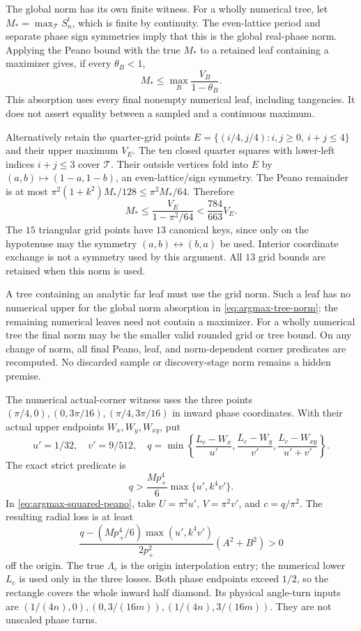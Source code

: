 The global norm has its own finite witness.  For a wholly numerical
tree, let $M_* =\max_{\mathcal T}S_n^t$, which is finite by continuity.
The even-lattice period and separate phase sign symmetries imply that
this is the global real-phase norm.  Applying the Peano bound with
the true $M_*$ to a retained leaf containing a maximizer gives, if
every $\theta_B<1$,
\begin{equation}
 M_*\leq\max_B\frac{V_B}{1-\theta_B}.
                                                        \label{eq:argmax-tree-norm}
\end{equation}
This absorption uses every final nonempty numerical leaf, including
tangencies.  It does not assert equality between a sampled and a
continuous maximum.

Alternatively retain the quarter-grid points
$E=\{(i/4,j/4):i,j\geq0,\ i+j\leq4\}$ and their upper maximum $V_E$.
The ten closed quarter squares with lower-left indices $i+j\leq3$
cover $\mathcal T$.  Their outside vertices fold into $E$ by
$(a,b)\mapsto(1-a,1-b)$, an even-lattice/sign symmetry.  The Peano
remainder is at most $\pi^2(1+k^2)M_*/128\leq\pi^2M_*/64$.
Therefore
\begin{equation}
 M_*\leq\frac{V_E}{1-\pi^2/64}<\frac{784}{663}V_E.
                                                        \label{eq:argmax-grid-norm}
\end{equation}
The $15$ triangular grid points have $13$ canonical keys, since only
on the hypotenuse may the symmetry $(a,b)\leftrightarrow(b,a)$ be used.
Interior coordinate exchange is not a symmetry used by this argument.
All $13$ grid bounds are retained when this norm is used.

A tree containing an analytic far leaf must use the grid norm.
Such a leaf has no numerical upper for the global norm absorption in
\eqref{eq:argmax-tree-norm}; the remaining numerical leaves need not
contain a maximizer.  For a wholly numerical tree the final norm may
be the smaller valid rounded grid or tree bound.  On any change of
norm, all final Peano, leaf, and norm-dependent corner predicates are
recomputed.  No discarded sample or discovery-stage norm remains a
hidden premise.

The numerical actual-corner witness uses the three points
$(\pi/4,0),(0,3\pi/16),(\pi/4,3\pi/16)$ in inward phase coordinates.
With their actual upper endpoints $W_x,W_y,W_{xy}$, put
\[
 u'=1/32,\quad v'=9/512,\quad
 q=\min\left\{\frac{L_c-W_x}{u'},\frac{L_c-W_y}{v'},
                         \frac{L_c-W_{xy}}{u'+v'}\right\}.
\]
The exact strict predicate is
\begin{equation}
 q>\frac{Mp_+^4}{6}\max\{u',k^4v'\}.             \label{eq:argmax-finite-corner-test}
\end{equation}
In \eqref{eq:argmax-squared-peano}, take
$U=\pi^2u'$, $V=\pi^2v'$, and $c=q/\pi^2$.
The resulting radial loss is at least
\[
 \frac{q-(Mp_+^4/6)\max(u',k^4v')}{2p_+^2}(A^2+B^2)>0
\]
off the origin.  The true $\Lambda_c$ is the origin interpolation
entry; the numerical lower $L_c$ is used only in the three losses.
Both phase endpoints exceed $1/2$, so the rectangle covers the whole
inward half diamond.  Its physical angle-turn inputs are
$(1/(4n),0),(0,3/(16m)),(1/(4n),3/(16m))$.
They are not unscaled phase turns.

